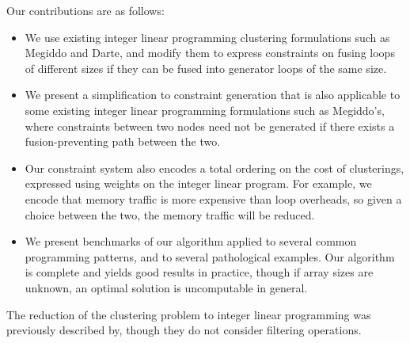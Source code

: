 Our contributions are as follows:

\begin{itemize}
\item   
We use existing integer linear programming clustering formulations such as Megiddo\cite{megiddo1998optimal} and Darte\cite{darte2002contraction},
and modify them to express constraints on fusing loops of different sizes if they can be fused into generator loops of the same size.

\item
We present a simplification to constraint generation that is also applicable to some existing integer linear programming formulations such as Megiddo's,
where constraints between two nodes need not be generated if there exists a fusion-preventing path between the two. 

\item
Our constraint system also encodes a total ordering on the cost of clusterings, expressed using weights on the integer linear program.
For example, we encode that memory traffic is more expensive than loop overheads, so given a choice between the two, the memory traffic will be reduced.

\item
We present benchmarks of our algorithm applied to several common programming patterns, and to several pathological examples.
Our algorithm is complete and yields good results in practice, though if array sizes are unknown, an optimal solution is uncomputable in general. 
\end{itemize}

The reduction of the clustering problem to integer linear programming was previously described by\cite{megiddo1998optimal}, though they do not consider filtering operations.



